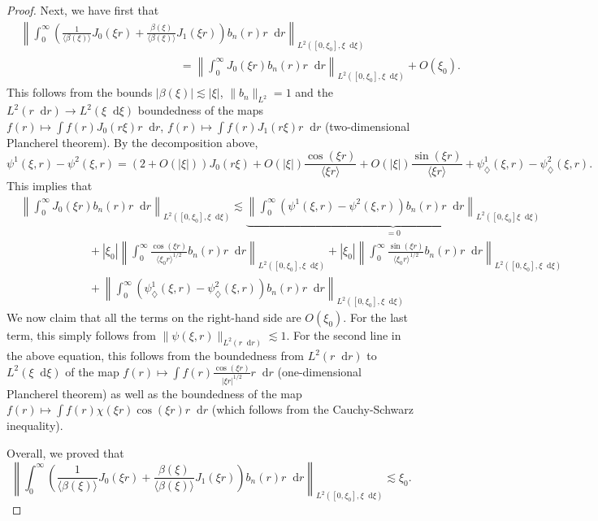 \documentclass[11 pt]{amsart}
\theoremstyle{definition}
\theoremstyle{remark}
\numberwithin{equation}{section}
\newcommand{\dd}{\mathop{}\!\mathrm{d}}
\begin{document}
\begin{proof}
Next, we have first that
\begin{align*}
& \left\| \int_0^\infty \left( \frac{1}{\langle \beta (\xi) \rangle} J_0 (\xi r) + \frac{\beta (\xi)}{\langle \beta (\xi) \rangle} J_1 (\xi r) \right) b_n (r) r \dd r \right\|_{L^2([0,\xi_0],\xi \dd \xi)}\\
& \qquad \qquad\qquad \qquad \qquad\qquad \qquad = \left\| \int_0^\infty J_0 (\xi r) b_n (r) r \dd r \right\|_{L^2([0,\xi_0],\xi \dd \xi)} + O(\xi_0).
\end{align*}
This follows from the bounds $|\beta(\xi)| \lesssim |\xi|$, $\| b_n \|_{L^2} = 1$ and the $L^2(r \dd r) \to L^2( \xi \dd \xi)$ boundedness of the maps $f(r) \mapsto \int f(r) J_0(r\xi) r \dd r$, $f(r) \mapsto \int f(r) J_1(r\xi) r \dd r$ (two-dimensional Plancherel theorem). By the decomposition above,
$$
\psi^1(\xi,r) - \psi^2(\xi,r) = (2 + O(|\xi|)) J_0(r\xi) + O(|\xi|) \frac{\cos(\xi r)}{\langle \xi r \rangle} + O(|\xi|) \frac{\sin(\xi r)}{\langle \xi r \rangle} + \psi_\diamondsuit^1(\xi, r) - \psi_\diamondsuit^2(\xi, r).
$$
This implies that
\begin{align*}
&\left\| \int_0^\infty J_0 (\xi r) b_n (r) r \dd r \right\|_{L^2([0,\xi_0],\xi \dd \xi)} \lesssim \underbrace{\left\| \int_0^\infty (\psi^1(\xi,r) - \psi^2(\xi,r) ) b_n (r) r \dd r \right\|_{L^2([0,\xi_0]\xi \dd \xi)}}_{\displaystyle =0} \\
&  \qquad\qquad \qquad+ |\xi_0| \left\| \int_0^\infty \frac{\cos(\xi r)}{\langle \xi_0 r \rangle^{1/2}} b_n (r) r \dd r \right\|_{L^2([0,\xi_0],\xi \dd \xi)} + |\xi_0| \left\| \int_0^\infty \frac{\sin(\xi r)}{\langle \xi_0 r \rangle^{1/2}} b_n (r) r \dd r \right\|_{L^2([0,\xi_0],\xi \dd \xi)} \\
&  \qquad \qquad \qquad + \left\| \int_0^\infty (\psi_{\diamondsuit}^1 (\xi, r) - \psi_{\diamondsuit}^2 (\xi, r)) b_n (r) r \dd r \right\|_{L^2([0,\xi_0],\xi \dd \xi)}
\end{align*}
We now claim that all the terms on the right-hand side are $O(\xi_0)$. For the last term, this simply follows from $\| \psi(\xi,r) \|_{L^2(r \dd r)} \lesssim 1$. For the second line in the above equation, this follows from the boundedness from $L^2(r \dd r)$ to $L^2(\xi \dd \xi)$ of the map $f(r) \mapsto \int f(r) \frac{\cos(\xi r)}{|\xi r|^{1/2}} r \dd r$ (one-dimensional Plancherel theorem) as well as the boundedness of the map $f(r) \mapsto \int f(r) \chi(\xi r) \cos(\xi r) r \dd r$ (which follows from the Cauchy-Schwarz inequality).

Overall, we proved that
$$
\left\| \int_0^\infty \left( \frac{1}{\langle \beta (\xi) \rangle} J_0 (\xi r) + \frac{\beta (\xi)}{\langle \beta (\xi) \rangle} J_1 (\xi r) \right) b_n (r) r \dd r \right\|_{L^2([0,\xi_0],\xi \dd \xi)} \lesssim \xi_0.
$$


\end{proof}
\end{document}
